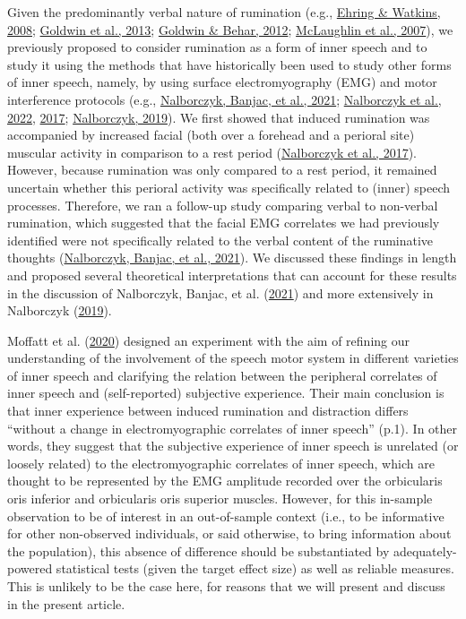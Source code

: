 \documentclass[
  man, donotrepeattitle,floatsintext]{apa6}
\begin{document}
Given the predominantly verbal nature of rumination (e.g., \protect\hyperlink{ref-ehring_repetitive_2008}{Ehring \& Watkins, 2008}; \protect\hyperlink{ref-goldwin_concreteness_2013}{Goldwin et al., 2013}; \protect\hyperlink{ref-goldwin_concreteness_2012}{Goldwin \& Behar, 2012}; \protect\hyperlink{ref-mclaughlin_effects_2007}{McLaughlin et al., 2007}), we previously proposed to consider rumination as a form of inner speech and to study it using the methods that have historically been used to study other forms of inner speech, namely, by using surface electromyography (EMG) and motor interference protocols (e.g., \protect\hyperlink{ref-nalborczyk_dissociating_2021}{Nalborczyk, Banjac, et al., 2021}; \protect\hyperlink{ref-nalborczyk_articulatory_2022}{Nalborczyk et al., 2022}, \protect\hyperlink{ref-nalborczyk_orofacial_2017}{2017}; \protect\hyperlink{ref-nalborczyk_understanding_2019}{Nalborczyk, 2019}). We first showed that induced rumination was accompanied by increased facial (both over a forehead and a perioral site) muscular activity in comparison to a rest period (\protect\hyperlink{ref-nalborczyk_orofacial_2017}{Nalborczyk et al., 2017}). However, because rumination was only compared to a rest period, it remained uncertain whether this perioral activity was specifically related to (inner) speech processes. Therefore, we ran a follow-up study comparing verbal to non-verbal rumination, which suggested that the facial EMG correlates we had previously identified were not specifically related to the verbal content of the ruminative thoughts (\protect\hyperlink{ref-nalborczyk_dissociating_2021}{Nalborczyk, Banjac, et al., 2021}). We discussed these findings in length and proposed several theoretical interpretations that can account for these results in the discussion of Nalborczyk, Banjac, et al. (\protect\hyperlink{ref-nalborczyk_dissociating_2021}{2021}) and more extensively in Nalborczyk (\protect\hyperlink{ref-nalborczyk_understanding_2019}{2019}).

Moffatt et al. (\protect\hyperlink{ref-moffatt_inner_2020}{2020}) designed an experiment with the aim of refining our understanding of the involvement of the speech motor system in different varieties of inner speech and clarifying the relation between the peripheral correlates of inner speech and (self-reported) subjective experience. Their main conclusion is that inner experience between induced rumination and distraction differs ``without a change in electromyographic correlates of inner speech'' (p.1). In other words, they suggest that the subjective experience of inner speech is unrelated (or loosely related) to the electromyographic correlates of inner speech, which are thought to be represented by the EMG amplitude recorded over the orbicularis oris inferior and orbicularis oris superior muscles. However, for this in-sample observation to be of interest in an out-of-sample context (i.e., to be informative for other non-observed individuals, or said otherwise, to bring information about the population), this absence of difference should be substantiated by adequately-powered statistical tests (given the target effect size) as well as reliable measures. This is unlikely to be the case here, for reasons that we will present and discuss in the present article.
\end{document}
